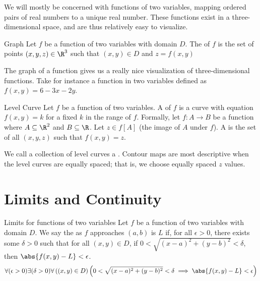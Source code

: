 \documentclass[math]{amznotes}
\begin{document}
We will mostly be concerned with functions of two variables, mapping ordered pairs of real numbers to a unique real number. These functions exist in a three-dimensional space, and are thus relatively easy to visualize.

\begin{dfnbox}{Graph}{}
    Let $f$ be a function of two variables with domain $D$. The  of $f$ is the set of points $(x,y,z) \in \R^3$ such that $(x,y) \in D$ and $z = f(x,y)$
\end{dfnbox}

The graph of a function gives us a really nice visualization of three-dimensional functions. Take for instance a function in two variables defined as $f(x,y) = 6 - 3x - 2y$. 




\begin{dfnbox}{Level Curve}{}
    Let $f$ be a function of two variables. A  of $f$ is a curve with equation $f(x,y) = k$ for a fixed $k$ in the range of $f$.
    \tcblower
    Formally, let $f : A \to B$ be a function where $A \subseteq \R^2$ and $B \subseteq \R$. Let $z \in f[A]$ (the image of $A$ under $f$). A  is the set of all $(x,y,z)$ such that $f(x,y) = z$.
\end{dfnbox}

We call a collection of level curves a . Contour maps are most descriptive when the level curves are equally spaced; that is, we choose equally spaced $z$ values.

\section{Limits and Continuity}

\begin{dfnbox}{Limits for functions of two variables}{}
    Let $f$ be a function of two variables with domain $D$. We say the  as $f$ approaches $(a,b)$ is $L$ if, for all $\epsilon > 0$, there exists some $\delta > 0$ such that for all $(x,y) \in D$, if $0 < \sqrt{(x-a)^2 + (y-b)^2} < \delta$, then $\abs{f(x,y) - L} < \epsilon$.
    \tcblower
    \[ \forall(\epsilon > 0) \exists(\delta > 0) \forall \left( (x,y) \in D \right) \left(0 < \sqrt{(x-a)^2 + (y-b)^2} < \delta \implies \abs{f(x,y) - L} < \epsilon\right) \]
\end{dfnbox}

\amzindex
\end{document}
